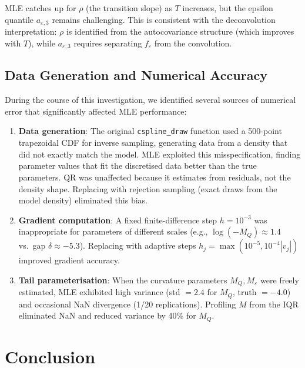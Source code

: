 \documentclass[12pt]{article}
\begin{document}
\noindent
MLE catches up for $\rho$ (the transition slope) as $T$ increases, but
the epsilon quantile $a_{\varepsilon,3}$ remains challenging.
This is consistent with the deconvolution interpretation: $\rho$ is
identified from the autocovariance structure (which improves with $T$),
while $a_{\varepsilon,3}$ requires separating $f_\varepsilon$ from the
convolution.

\subsection{Data Generation and Numerical Accuracy}

During the course of this investigation, we identified several sources of
numerical error that significantly affected MLE performance:

\begin{enumerate}
\item \textbf{Data generation}: The original \texttt{cspline\_draw} function
  used a 500-point trapezoidal CDF for inverse sampling, generating data
  from a density that did not exactly match the model.
  MLE exploited this misspecification, finding parameter values that fit
  the discretised data better than the true parameters.
  QR was unaffected because it estimates from residuals, not the density shape.
  Replacing with rejection sampling (exact draws from the model density)
  eliminated this bias.

\item \textbf{Gradient computation}: A fixed finite-difference step
  $h = 10^{-3}$ was inappropriate for parameters of different scales
  (e.g., $\log(-M_Q) \approx 1.4$ vs.\ gap $\delta \approx -5.3$).
  Replacing with adaptive steps $h_j = \max(10^{-5}, 10^{-4}|v_j|)$
  improved gradient accuracy.

\item \textbf{Tail parameterisation}: When the curvature parameters
  $M_Q, M_\varepsilon$ were freely estimated, MLE exhibited high variance
  (std $= 2.4$ for $M_Q$, truth $= -4.0$) and occasional NaN divergence
  (1/20 replications).
  Profiling $M$ from the IQR eliminated NaN and reduced variance by
  40\% for $M_Q$.
\end{enumerate}

\section{Conclusion}
\label{sec:conclusion}
\end{document}
